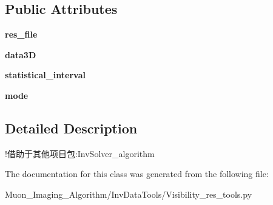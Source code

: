 \subsection*{Public Attributes}
\begin{DoxyCompactItemize}
\item 
\mbox{\label{classMIS_1_1Muon__Imaging__Algorithm_1_1InvDataTools_1_1Visibility__res__tools_1_1show__2D__the__density__of__res_a71139b48c23806d795f5f3e49f91dd41}} 
{\bfseries res\+\_\+file}
\item 
\mbox{\label{classMIS_1_1Muon__Imaging__Algorithm_1_1InvDataTools_1_1Visibility__res__tools_1_1show__2D__the__density__of__res_a9eda818005dc1564cb8b49617e7efe16}} 
{\bfseries data3D}
\item 
\mbox{\label{classMIS_1_1Muon__Imaging__Algorithm_1_1InvDataTools_1_1Visibility__res__tools_1_1show__2D__the__density__of__res_aef1ff7aad040ca2a696df5934ecdb966}} 
{\bfseries statistical\+\_\+interval}
\item 
\mbox{\label{classMIS_1_1Muon__Imaging__Algorithm_1_1InvDataTools_1_1Visibility__res__tools_1_1show__2D__the__density__of__res_a04cb51f4b9574f880f1940ab0caa4fae}} 
{\bfseries mode}
\end{DoxyCompactItemize}


\subsection{Detailed Description}
\begin{DoxyVerb}!借助于其他项目包:InvSolver\Seed_algorithm
\end{DoxyVerb}
 

The documentation for this class was generated from the following file\+:\begin{DoxyCompactItemize}
\item 
Muon\+\_\+\+Imaging\+\_\+\+Algorithm/\+Inv\+Data\+Tools/Visibility\+\_\+res\+\_\+tools.\+py\end{DoxyCompactItemize}
